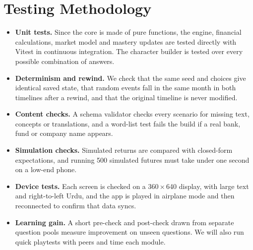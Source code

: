 \documentclass[11pt,a4paper]{article}
\begin{document}
\section{Testing Methodology}

\begin{itemize}
  \item \textbf{Unit tests.} Since the core is made of pure functions, the engine, financial calculations, market model and mastery updates are tested directly with Vitest in continuous integration. The character builder is tested over every possible combination of answers.
  \item \textbf{Determinism and rewind.} We check that the same seed and choices give identical saved state, that random events fall in the same month in both timelines after a rewind, and that the original timeline is never modified.
  \item \textbf{Content checks.} A schema validator checks every scenario for missing text, concepts or translations, and a word-list test fails the build if a real bank, fund or company name appears.
  \item \textbf{Simulation checks.} Simulated returns are compared with closed-form expectations, and running 500 simulated futures must take under one second on a low-end phone.
  \item \textbf{Device tests.} Each screen is checked on a 360\,$\times$\,640 display, with large text and right-to-left Urdu, and the app is played in airplane mode and then reconnected to confirm that data syncs.
  \item \textbf{Learning gain.} A short pre-check and post-check drawn from separate question pools measure improvement on unseen questions. We will also run quick playtests with peers and time each module.
\end{itemize}
\end{document}
